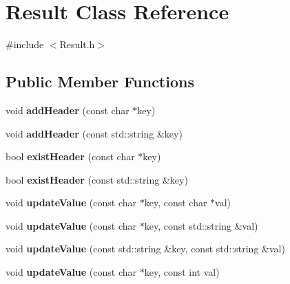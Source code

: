 \hypertarget{classResult}{\section{Result Class Reference}
\label{classResult}
}


{\ttfamily \#include $<$Result.\-h$>$}

\subsection*{Public Member Functions}
\begin{DoxyCompactItemize}
\item 
\hypertarget{classResult_a0f63b072d7567f84134ffcec3a924f2a}{void {\bfseries add\-Header} (const char $\ast$key)}\label{classResult_a0f63b072d7567f84134ffcec3a924f2a}

\item 
\hypertarget{classResult_a87c00e9ed537c49dcef0685dae7ec9dc}{void {\bfseries add\-Header} (const std\-::string \&key)}\label{classResult_a87c00e9ed537c49dcef0685dae7ec9dc}

\item 
\hypertarget{classResult_a50cb5f518e5ca57b014b9d0573adb4d5}{bool {\bfseries exist\-Header} (const char $\ast$key)}\label{classResult_a50cb5f518e5ca57b014b9d0573adb4d5}

\item 
\hypertarget{classResult_a1ff6471da8b9a1b0130590c3e590db6d}{bool {\bfseries exist\-Header} (const std\-::string \&key)}\label{classResult_a1ff6471da8b9a1b0130590c3e590db6d}

\item 
\hypertarget{classResult_a10a69516ab8591397f866cad16c7a61d}{void {\bfseries update\-Value} (const char $\ast$key, const char $\ast$val)}\label{classResult_a10a69516ab8591397f866cad16c7a61d}

\item 
\hypertarget{classResult_a78a0b995f32f4d24baea05cf6a9af4f4}{void {\bfseries update\-Value} (const char $\ast$key, const std\-::string \&val)}\label{classResult_a78a0b995f32f4d24baea05cf6a9af4f4}

\item 
\hypertarget{classResult_afb4a534e62e3d40a8361fe2ecd4d920a}{void {\bfseries update\-Value} (const std\-::string \&key, const std\-::string \&val)}\label{classResult_afb4a534e62e3d40a8361fe2ecd4d920a}

\item 
\hypertarget{classResult_aa89d84fbcf87eae1d61a5b1b039aa007}{void {\bfseries update\-Value} (const char $\ast$key, const int val)}\label{classResult_aa89d84fbcf87eae1d61a5b1b039aa007}


\end{DoxyCompactItemize}

